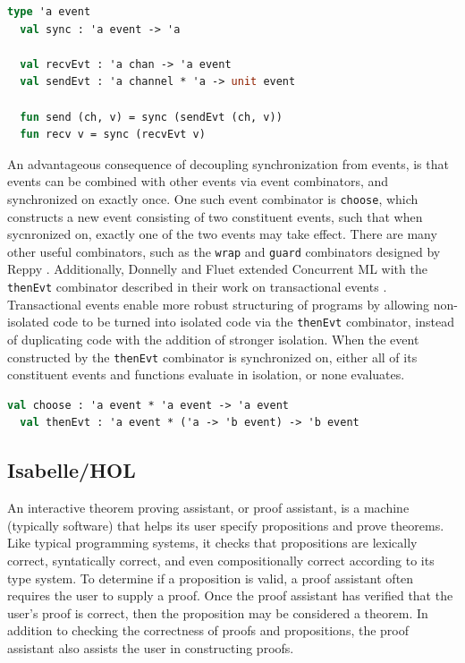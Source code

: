 \documentclass[letterpaper, 11pt]{extarticle}
\begin{document}
\begin{lstlisting}[language=ML, mathescape]
  type 'a event
  val sync : 'a event -> 'a

  val recvEvt : 'a chan -> 'a event
  val sendEvt : 'a channel * 'a -> unit event

  fun send (ch, v) = sync (sendEvt (ch, v))
  fun recv v = sync (recvEvt v)
\end{lstlisting}

An advantageous consequence of decoupling synchronization from events, is that events can be
combined with other events via event combinators, and synchronized on exactly once. One such
event combinator is \lstinline{choose}, which constructs a new event consisting of two
constituent events, such that when sycnronized on, exactly one of the two events may take
effect. There are many other useful combinators, such as the \lstinline{wrap} and
\lstinline{guard} combinators designed by Reppy \cite{reppy2007specialization}.
Additionally, Donnelly and Fluet extended
Concurrent ML with the \lstinline{thenEvt} combinator described in their work on
transactional events \cite{donnelly2008transactional}. Transactional events enable more robust
structuring of programs by allowing non-isolated code to be turned into isolated code via
the \lstinline{thenEvt} combinator, instead of duplicating code with the addition of stronger
isolation. When the event constructed by the \lstinline{thenEvt} combinator is synchronized
on, either all of its constituent events and functions evaluate in isolation, or none
evaluates.

\begin{lstlisting}[language=ML, mathescape]
  val choose : 'a event * 'a event -> 'a event
  val thenEvt : 'a event * ('a -> 'b event) -> 'b event
  \end{lstlisting}


\subsection{Isabelle/HOL}
An interactive theorem proving assistant, or proof assistant, is a machine (typically software) that helps its user
specify propositions and prove theorems. Like typical programming systems, it checks
that propositions are lexically correct, syntatically correct, and
even compositionally correct according to its type system. To determine if a proposition is valid, a proof assistant
often requires the user to supply a proof. Once the proof assistant has verified that the user's proof is correct,
then the proposition may be considered a theorem. In addition to checking the correctness of proofs and
propositions, the proof assistant also assists the user in constructing proofs.
\end{document}
